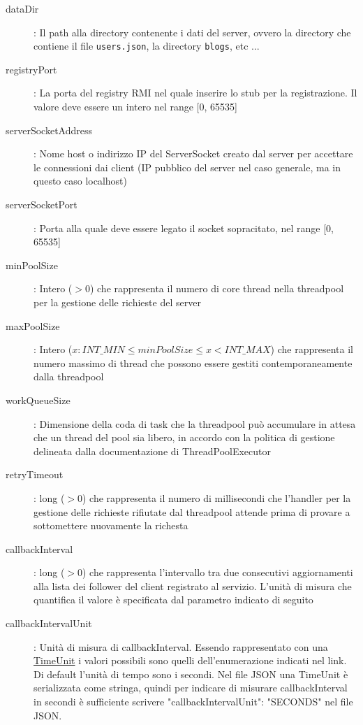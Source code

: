 \begin{description}
	\item[dataDir]: Il path alla directory contenente i dati del server, ovvero la directory
	che contiene il file \verb|users.json|, la directory \verb|blogs|, etc ...
	\item[registryPort]: La porta del registry RMI nel quale inserire lo stub per la registrazione. Il valore deve essere un intero nel range [0, 65535]
	\item[serverSocketAddress]: Nome host o indirizzo IP del ServerSocket creato dal server per accettare le connessioni dai client (IP pubblico del server nel caso generale, ma in questo caso localhost)
	\item[serverSocketPort]: Porta alla quale deve essere legato il socket sopracitato, nel range [0, 65535]
	\item[minPoolSize]: Intero ($>0$) che rappresenta il numero di core thread nella threadpool per la gestione delle richieste del server
	\item[maxPoolSize]: Intero ($x : INT\_MIN \le minPoolSize \le x < INT\_MAX$) che rappresenta il numero massimo di thread che possono essere gestiti contemporaneamente dalla threadpool
	\item[workQueueSize]: Dimensione della coda di task che la threadpool può accumulare in attesa che un thread del pool sia libero, in accordo con la politica di gestione delineata dalla documentazione di ThreadPoolExecutor
	\item[retryTimeout]: long ($>0$) che rappresenta il numero di millisecondi che l'handler per la gestione delle richieste rifiutate dal threadpool attende prima di provare a sottomettere nuovamente la richesta
	\item[callbackInterval]: long ($>0$) che rappresenta l'intervallo tra due consecutivi aggiornamenti alla lista dei follower del client registrato al servizio. L'unità di misura che quantifica il valore è specificata dal parametro indicato di seguito
	\item[callbackIntervalUnit]: Unità di misura di callbackInterval. Essendo rappresentato con una\\
	\hyperref{https://docs.oracle.com/en/java/javase/11/docs/api/java.base/java/util/concurrent/TimeUnit.html#enum.constant.summary}{category}{name}{TimeUnit} i valori possibili sono quelli dell'enumerazione indicati nel link. Di default l'unità di tempo sono i secondi. Nel file JSON una TimeUnit è serializzata come stringa, quindi per indicare di misurare callbackInterval in secondi è sufficiente scrivere
	"callbackIntervalUnit": "SECONDS" nel file JSON.
\end{description}
